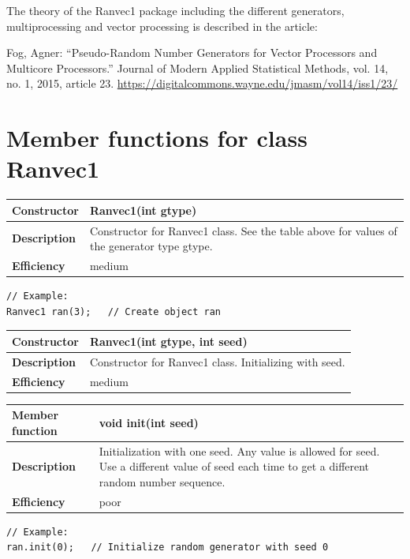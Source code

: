 \documentclass[11pt,a4paper,oneside,openright]{report}
\newcommand{\vspacesmall}{\vspace{3mm}}
\newcommand{\vspacebig}{\vspace{6mm}}
\begin{document}
The theory of the Ranvec1 package including the different generators, multiprocessing and vector processing is described in the article: 
\label{Fog2015TheoryArticle}

Fog, Agner: “Pseudo-Random Number Generators for Vector Processors and Multicore Processors.” Journal of Modern Applied Statistical Methods, vol. 14, no. 1, 2015, article 23. \url{https://digitalcommons.wayne.edu/jmasm/vol14/iss1/23/}
\vspacebig

\section{Member functions for class Ranvec1}\label{MemberFunctions}
\vspacesmall

\begin{tabular}{|p{30mm}|p{100mm}|}
\hline
\bfseries Constructor & Ranvec1(int gtype) \\ \hline
\bfseries Description & Constructor for Ranvec1 class. See the table above for values of the generator type gtype. \\ \hline
\bfseries Efficiency & medium \\ \hline
\end{tabular}
\begin{lstlisting}[frame=none]
// Example:
Ranvec1 ran(3);   // Create object ran
\end{lstlisting}
\vspacesmall

\begin{tabular}{|p{30mm}|p{100mm}|}
\hline
\bfseries Constructor & Ranvec1(int gtype, int seed) \\ \hline
\bfseries Description & Constructor for Ranvec1 class. Initializing with seed. \\ \hline
\bfseries Efficiency & medium \\ \hline
\end{tabular}
\vspacesmall

\begin{tabular}{|p{30mm}|p{100mm}|}
\hline
\bfseries Member function & void init(int seed) \\ \hline
\bfseries Description & Initialization with one seed. Any value is allowed for seed. Use a different value of seed each time to get a different random number sequence. \\ \hline
\bfseries Efficiency & poor \\ \hline
\end{tabular}
\begin{lstlisting}[frame=none]
// Example:
ran.init(0);   // Initialize random generator with seed 0
\end{lstlisting}
\vspacesmall
\end{document}
